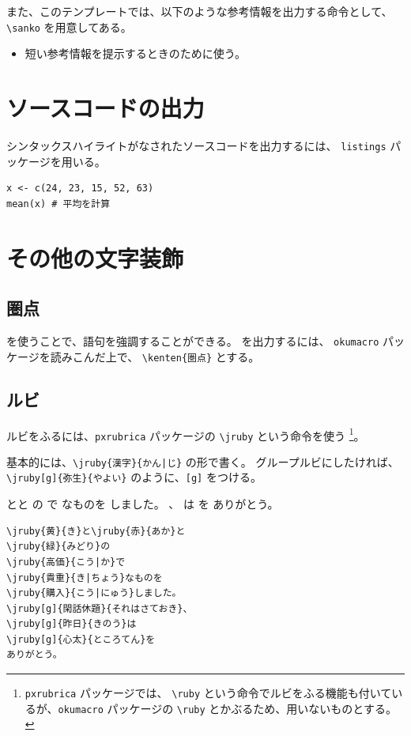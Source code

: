 \documentclass[ %
  uplatex,%
  a5paper,%
  papersize%
]{jsbook}
\newcommand{\sanko}[1]{%
  \begin{itemize}
    \item[\mysbox{\small\gtfamily 参考}] #1
  \end{itemize}
}
\begin{document}
また、このテンプレートでは、以下のような参考情報を出力する命令として、\verb|\sanko| を用意してある。

\sanko{短い参考情報を提示するときのために使う。}


\section{ソースコードの出力}

シンタックスハイライトがなされたソースコードを出力するには、
\texttt{listings} パッケージを用いる。

\begin{lstlisting}[caption=簡単なプログラムの例, label=ls:example]
x <- c(24, 23, 15, 52, 63)
mean(x) # 平均を計算
\end{lstlisting}


\section{その他の文字装飾}

\subsection{圏点}
を使うことで、語句を強調することができる。
を出力するには、
\texttt{okumacro} パッケージを読みこんだ上で、
\verb|\kenten{圏点}| とする。 


\subsection{ルビ}
ルビをふるには、\texttt{pxrubrica} パッケージの \verb|\jruby| という命令を使う
\footnote{\texttt{pxrubrica} パッケージでは、 \verb|\ruby| という命令でルビをふる機能も付いているが、\texttt{okumacro} パッケージの \verb|\ruby| とかぶるため、用いないものとする。}。

基本的には、\verb#\jruby{漢字}{かん|じ}# の形で書く。
グループルビにしたければ、\verb|\jruby[g]{弥生}{やよい}| のように、\verb|[g]| をつける。

\begin{tcolorbox}[title=ルビの例, sidebyside, sidebyside align=top, righthand ratio=0.7]
とと
の
で
なものを
しました。
、
は
を
ありがとう。
\tcblower
\begin{verbatim}
\jruby{黄}{き}と\jruby{赤}{あか}と
\jruby{緑}{みどり}の
\jruby{高価}{こう|か}で
\jruby{貴重}{き|ちょう}なものを
\jruby{購入}{こう|にゅう}しました。
\jruby[g]{閑話休題}{それはさておき}、
\jruby[g]{昨日}{きのう}は
\jruby[g]{心太}{ところてん}を
ありがとう。
\end{verbatim}
\end{tcolorbox}
\end{document}
